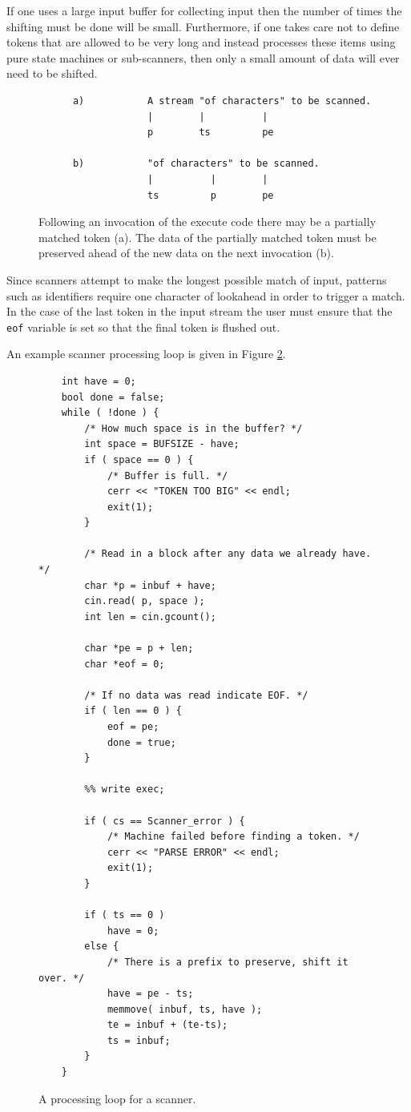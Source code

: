 \documentclass[letterpaper,11pt,oneside]{book}
\begin{document}
If one uses a large input buffer for collecting input then the number of times
the shifting must be done will be small. Furthermore, if one takes care not to
define tokens that are allowed to be very long and instead processes these
items using pure state machines or sub-scanners, then only a small amount of
data will ever need to be shifted.

\begin{figure}
\begin{verbatim}
      a)           A stream "of characters" to be scanned.
                   |        |          |
                   p        ts         pe

      b)           "of characters" to be scanned.
                   |          |        |
                   ts         p        pe
\end{verbatim}
\caption{Following an invocation of the execute code there may be a partially
matched token (a). The data of the partially matched token 
must be preserved ahead of the new data on the next invocation (b).}
\label{preserve_example}
\end{figure}

Since scanners attempt to make the longest possible match of input, patterns
such as identifiers require one character of lookahead in order to trigger a
match. In the case of the last token in the input stream the user must ensure
that the \verb|eof| variable is set so that the final token is flushed out.

An example scanner processing loop is given in Figure \ref{scanner-loop}.

\begin{figure}
\small
\begin{verbatim}
    int have = 0;
    bool done = false;
    while ( !done ) {
        /* How much space is in the buffer? */
        int space = BUFSIZE - have;
        if ( space == 0 ) {
            /* Buffer is full. */
            cerr << "TOKEN TOO BIG" << endl;
            exit(1);
        }

        /* Read in a block after any data we already have. */
        char *p = inbuf + have;
        cin.read( p, space );
        int len = cin.gcount();

        char *pe = p + len;
        char *eof = 0;

        /* If no data was read indicate EOF. */
        if ( len == 0 ) {
            eof = pe;
            done = true;
        }

        %% write exec;

        if ( cs == Scanner_error ) {
            /* Machine failed before finding a token. */
            cerr << "PARSE ERROR" << endl;
            exit(1);
        }

        if ( ts == 0 )
            have = 0;
        else {
            /* There is a prefix to preserve, shift it over. */
            have = pe - ts;
            memmove( inbuf, ts, have );
            te = inbuf + (te-ts);
            ts = inbuf;
        }
    }
\end{verbatim}
\caption{A processing loop for a scanner.}
\label{scanner-loop}
\end{figure}
\end{document}

